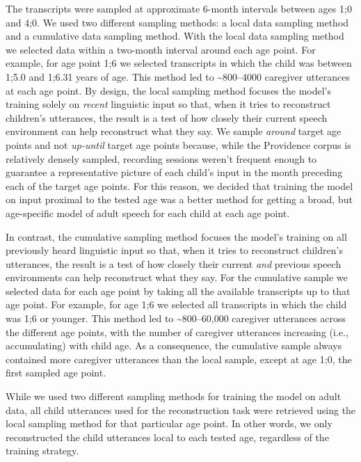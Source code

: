\documentclass[
  english,
  man,floatsintext]{apa6}
\begin{document}
The transcripts were sampled at approximate 6-month intervals between ages 1;0 and 4;0. We used two different sampling methods: a local data sampling method and a cumulative data sampling method. With the local data sampling method we selected data within a two-month interval around each age point. For example, for age point 1;6 we selected transcripts in which the child was between 1;5.0 and 1;6.31 years of age. This method led to \textasciitilde800--4000 caregiver utterances at each age point. By design, the local sampling method focuses the model's training solely on \emph{recent} linguistic input so that, when it tries to reconstruct children's utterances, the result is a test of how closely their current speech environment can help reconstruct what they say. We sample \emph{around} target age points and not \emph{up-until} target age points because, while the Providence corpus is relatively densely sampled, recording sessions weren't frequent enough to guarantee a representative picture of each child's input in the month preceding each of the target age points. For this reason, we decided that training the model on input proximal to the tested age was a better method for getting a broad, but age-specific model of adult speech for each child at each age point.

In contrast, the cumulative sampling method focuses the model's training on all previously heard linguistic input so that, when it tries to reconstruct children's utterances, the result is a test of how closely their current \emph{and} previous speech environments can help reconstruct what they say. For the cumulative sample we selected data for each age point by taking all the available transcripts up to that age point. For example, for age 1;6 we selected all transcripts in which the child was 1;6 or younger. This method led to \textasciitilde800--60,000 caregiver utterances across the different age points, with the number of caregiver utterances increasing (i.e., accumulating) with child age. As a consequence, the cumulative sample always contained more caregiver utterances than the local sample, except at age 1;0, the first sampled age point.

While we used two different sampling methods for training the model on adult data, all child utterances used for the reconstruction task were retrieved using the local sampling method for that particular age point. In other words, we only reconstructed the child utterances local to each tested age, regardless of the training strategy.
\end{document}
